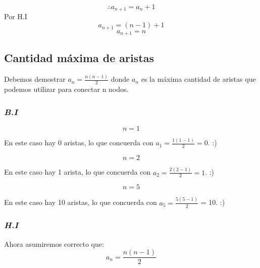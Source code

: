 \documentclass{article}
\begin{document}
\[\therefore a_{n+1} = a_{n} + 1\]
Por H.I
\[a_{n+1} = (n - 1) + 1\]
\[a_{n+1} = n\]
 

\subsection{Cantidad máxima de aristas}
Debemos demostrar $a_n = \frac{n(n-1)}{2} $ donde $a_n$ es la máxima cantidad de 
aristas que podemos utilizar para conectar n nodos.

\subsubsection*{\emph{B.I}}
\[ n = 1 \]

\begin{center}
\end{center}
En este caso hay 0 aristas, lo que concuerda con $a_1 = \frac{1(1-1)}{2} = 0$. :)

\[ n = 2 \]

\begin{center}
\end{center}
En este caso hay 1 arista, lo que concuerda con $a_2 = \frac{2(2-1)}{2} = 1$. :)


\[ n = 5 \]

\begin{center}
\end{center}
En este caso hay 10 aristas, lo que concuerda con $a_5 = \frac{5(5-1)}{2}$ = 10. :)

\subsubsection*{\emph{H.I}}
Ahora asumiremos correcto que:
\[ a_n = \frac{n(n-1)}{2} \]
\end{document}
